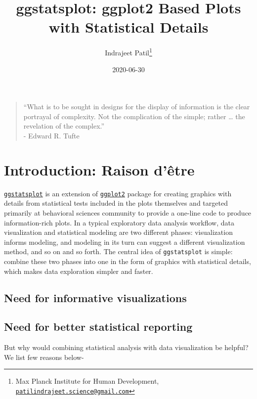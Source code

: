\documentclass[
]{article}
\title{ggstatsplot: ggplot2 Based Plots with Statistical Details}
\author{Indrajeet Patil\footnote{Max Planck Institute for Human Development, \href{mailto:patilindrajeet.science@gmail.com}{\nolinkurl{patilindrajeet.science@gmail.com}}}}
\date{2020-06-30}
\begin{document}
\maketitle

{
\hypersetup{linkcolor=}
\setcounter{tocdepth}{2}
\tableofcontents
}
\begin{quote}
``What is to be sought in designs for the display of information is the clear
portrayal of complexity. Not the complication of the simple; rather \ldots{} the
revelation of the complex.''\\
- Edward R. Tufte
\end{quote}

\hypertarget{introduction-raison-duxeatre}{%
\section{Introduction: Raison d'être}\label{introduction-raison-duxeatre}}

\href{https://indrajeetpatil.github.io/ggstatsplot/}{\texttt{ggstatsplot}} is an extension
of \href{https://github.com/tidyverse/ggplot2}{\texttt{ggplot2}} package for creating
graphics with details from statistical tests included in the plots themselves
and targeted primarily at behavioral sciences community to provide a one-line
code to produce information-rich plots. In a typical exploratory data analysis
workflow, data visualization and statistical modeling are two different phases:
visualization informs modeling, and modeling in its turn can suggest a
different visualization method, and so on and so forth. The central idea of
\texttt{ggstatsplot} is simple: combine these two phases into one in the form of
graphics with statistical details, which makes data exploration simpler and
faster.

\hypertarget{need-for-informative-visualizations}{%
\subsection{Need for informative visualizations}\label{need-for-informative-visualizations}}

\hypertarget{need-for-better-statistical-reporting}{%
\subsection{Need for better statistical reporting}\label{need-for-better-statistical-reporting}}

But why would combining statistical analysis with data visualization be helpful?
We list few reasons below-
\end{document}
